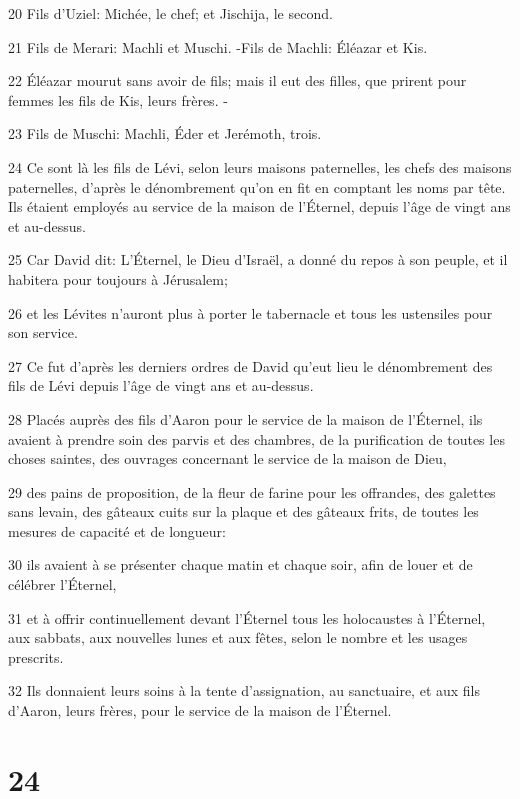\par 20 Fils d'Uziel: Michée, le chef; et Jischija, le second.
\par 21 Fils de Merari: Machli et Muschi. -Fils de Machli: Éléazar et Kis.
\par 22 Éléazar mourut sans avoir de fils; mais il eut des filles, que prirent pour femmes les fils de Kis, leurs frères. -
\par 23 Fils de Muschi: Machli, Éder et Jerémoth, trois.
\par 24 Ce sont là les fils de Lévi, selon leurs maisons paternelles, les chefs des maisons paternelles, d'après le dénombrement qu'on en fit en comptant les noms par tête. Ils étaient employés au service de la maison de l'Éternel, depuis l'âge de vingt ans et au-dessus.
\par 25 Car David dit: L'Éternel, le Dieu d'Israël, a donné du repos à son peuple, et il habitera pour toujours à Jérusalem;
\par 26 et les Lévites n'auront plus à porter le tabernacle et tous les ustensiles pour son service.
\par 27 Ce fut d'après les derniers ordres de David qu'eut lieu le dénombrement des fils de Lévi depuis l'âge de vingt ans et au-dessus.
\par 28 Placés auprès des fils d'Aaron pour le service de la maison de l'Éternel, ils avaient à prendre soin des parvis et des chambres, de la purification de toutes les choses saintes, des ouvrages concernant le service de la maison de Dieu,
\par 29 des pains de proposition, de la fleur de farine pour les offrandes, des galettes sans levain, des gâteaux cuits sur la plaque et des gâteaux frits, de toutes les mesures de capacité et de longueur:
\par 30 ils avaient à se présenter chaque matin et chaque soir, afin de louer et de célébrer l'Éternel,
\par 31 et à offrir continuellement devant l'Éternel tous les holocaustes à l'Éternel, aux sabbats, aux nouvelles lunes et aux fêtes, selon le nombre et les usages prescrits.
\par 32 Ils donnaient leurs soins à la tente d'assignation, au sanctuaire, et aux fils d'Aaron, leurs frères, pour le service de la maison de l'Éternel.

\chapter{24}


